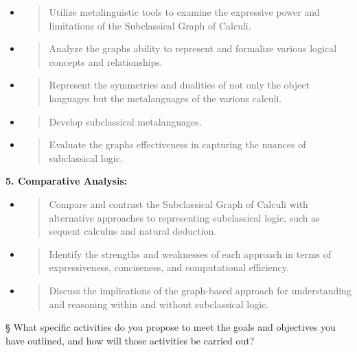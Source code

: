 \begin{itemize}
\item
  \begin{quote}
  Utilize metalinguistic tools to examine the expressive power and
  limitations of the Subclassical Graph of Calculi.
  \end{quote}
\item
  \begin{quote}
  Analyze the graph\textquotesingle s ability to represent and formalize
  various logical concepts and relationships.
  \end{quote}
\item
  \begin{quote}
  Represent the symmetries and dualities of not only the object
  languages but the metalanguages of the various calculi.
  \end{quote}
\item
  \begin{quote}
  Develop subclassical metalanguages.
  \end{quote}
\item
  \begin{quote}
  Evaluate the graph\textquotesingle s effectiveness in capturing the
  nuances of subclassical logic.
  \end{quote}
\end{itemize}

\textbf{5. Comparative Analysis:}

\begin{itemize}
\item
  \begin{quote}
  Compare and contrast the Subclassical Graph of Calculi with
  alternative approaches to representing subclassical logic, such as
  sequent calculus and natural deduction.
  \end{quote}
\item
  \begin{quote}
  Identify the strengths and weaknesses of each approach in terms of
  expressiveness, conciseness, and computational efficiency.
  \end{quote}
\item
  \begin{quote}
  Discuss the implications of the graph-based approach for understanding
  and reasoning within and without subclassical logic.
  \end{quote}
\end{itemize}

§ What specific activities do you propose to meet the goals and
objectives you have outlined, and how will those activities be carried
out?

